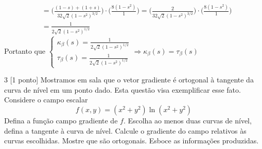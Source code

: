 \documentclass[../main.tex]{subfiles}
\begin{document}
\begin{solucao}
\begin{enumerate}
\begin{align*}
					&= \bigg(\frac{(1-s)+(1+s)}{32\sqrt{2}(1-s^2)^{3/2}}\bigg)\cdot\bigg(\frac{8(1-s^2)}{1}\bigg)=\bigg(\frac{2}{32\sqrt{2}(1-s^2)^{3/2}}\bigg)\cdot\bigg(\frac{8(1-s^2)}{1}\bigg)\\
					&=\frac{1}{2\sqrt{2}(1-s^2)^{1/2}}
				\end{align*}
				Portanto que
				$\begin{cases} \kappa_{\beta}(s)=\frac{1}{2\sqrt{2}(1-s^2)^{1/2}}\\ \tau_{\beta}(s)=\frac{1}{2\sqrt{2}(1-s^2)^{1/2}}\end{cases}\Rightarrow\kappa_{\beta}(s)=\tau_{\beta}(s)$
			\end{enumerate}
		\end{solucao}
		
		\begin{exercicio}{3}
			[1 ponto] Mostramos em sala que o vetor gradiente é ortogonal à tangente da curva de nível em um ponto dado. Esta questão visa exemplificar esse fato. Considere o campo escalar
			\[
			f(x,y)=(x^2+y^2)\ln(x^2+y^2)
			\]
			Defina a função campo gradiente de $f$. Escolha ao menos duas curvas de nível, defina a tangente à curva de nível. Calcule o gradiente do campo relativos às curvas escolhidas. Mostre que são ortogonais. Esboce as informações produzidas.
		\end{exercicio}
\end{document}
